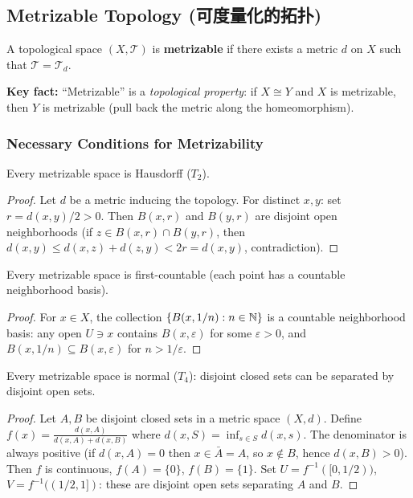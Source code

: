 \documentclass{article}
\begin{document}
\subsection{Metrizable Topology (可度量化的拓扑)}\label{def:metrizable}
\begin{definition}
  A topological space $(X, \mathcal{T})$ is \textbf{metrizable} if
  there exists a metric $d$ on $X$ such that $\mathcal{T} = \mathcal{T}_d$.
\end{definition}

\textbf{Key fact:} ``Metrizable'' is a \emph{topological property}:
if $X \cong Y$ and $X$ is metrizable, then $Y$ is metrizable
(pull back the metric along the homeomorphism).

\subsubsection*{Necessary Conditions for Metrizability}

\begin{proposition}
  Every metrizable space is Hausdorff ($T_2$).
\end{proposition}
\begin{proof}
  Let $d$ be a metric inducing the topology.
  For distinct $x, y$: set $r = d(x,y)/2 > 0$.
  Then $B(x,r)$ and $B(y,r)$ are disjoint open neighborhoods
  (if $z \in B(x,r) \cap B(y,r)$, then $d(x,y) \le d(x,z)+d(z,y) < 2r
  = d(x,y)$, contradiction).
\end{proof}

\begin{proposition}
  Every metrizable space is first-countable (each point has a countable
  neighborhood basis).
\end{proposition}
\begin{proof}
  For $x \in X$, the collection $\{B(x, 1/n) : n \in \mathbb{N}\}$ is a countable
  neighborhood basis: any open $U \ni x$ contains $B(x, \varepsilon)$ for some
  $\varepsilon > 0$, and $B(x, 1/n) \subseteq B(x, \varepsilon)$ for
  $n > 1/\varepsilon$.
\end{proof}

\begin{proposition}
  Every metrizable space is normal ($T_4$): disjoint closed sets can be
  separated by disjoint open sets.
\end{proposition}
\begin{proof}
  Let $A, B$ be disjoint closed sets in a metric space $(X,d)$.
  Define $f(x) = \frac{d(x,A)}{d(x,A)+d(x,B)}$ where $d(x,S) =
  \inf_{s \in S} d(x,s)$.
  The denominator is always positive (if $d(x,A)=0$ then $x \in \bar{A}=A$,
  so $x \notin B$, hence $d(x,B)>0$).
  Then $f$ is continuous, $f(A)=\{0\}$, $f(B)=\{1\}$.
  Set $U = f^{-1}([0,1/2))$, $V = f^{-1}((1/2,1])$: these are disjoint open
  sets separating $A$ and $B$.
\end{proof}
\end{document}
